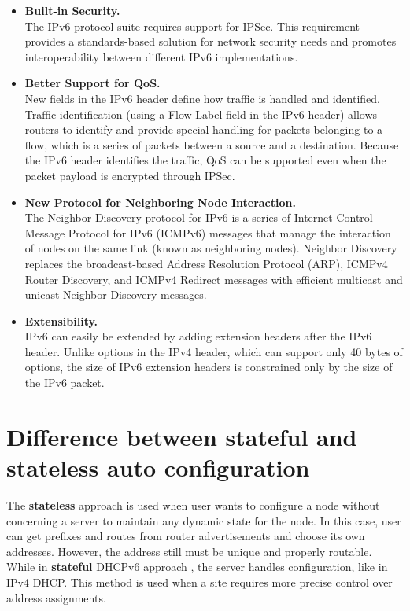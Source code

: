 \begin{itemize}
\item \textbf {Built-in Security.}
\\ The IPv6 protocol suite requires support for IPSec. This requirement provides a standards-based solution for network security needs and promotes interoperability between different IPv6 implementations.
\item \textbf{Better Support for QoS.}
\\ New fields in the IPv6 header define how traffic is handled and identified. Traffic identification (using a Flow Label field in the IPv6 header) allows routers to identify and provide special handling for packets belonging to a flow, which is a series of packets between a source and a destination. Because the IPv6 header identifies the traffic, QoS can be supported even when the packet payload is encrypted through IPSec.
\item \textbf {New Protocol for Neighboring Node Interaction.}
\\ The Neighbor Discovery protocol for IPv6 is a series of Internet Control Message Protocol for IPv6 (ICMPv6) messages that manage the interaction of nodes on the same link (known as neighboring nodes). Neighbor Discovery replaces the broadcast-based Address Resolution Protocol (ARP), ICMPv4 Router Discovery, and ICMPv4 Redirect messages with efficient multicast and unicast Neighbor Discovery messages.
\item \textbf {Extensibility.}
\\ IPv6 can easily be extended by adding extension headers after the IPv6 header. Unlike options in the IPv4 header, which can support only 40 bytes of options, the size of IPv6 extension headers is constrained only by the size of the IPv6 packet.
\end{itemize}

\section{Difference between stateful and stateless auto configuration}
The \textbf{stateless} approach is used when user wants to configure a node without concerning a server to maintain any dynamic state for the node. In this case, user can get prefixes and routes from router advertisements and choose its own addresses. However, the address still must be unique and properly routable.
While in  \textbf{stateful} DHCPv6 approach , the server handles configuration, like in IPv4 DHCP. This method is used when a site requires more precise control over address assignments.



